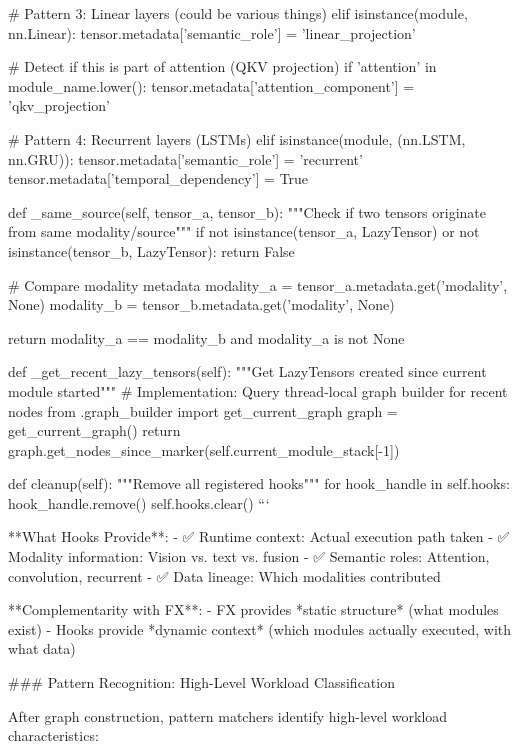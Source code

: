         # Pattern 3: Linear layers (could be various things)
        elif isinstance(module, nn.Linear):
            tensor.metadata['semantic_role'] = 'linear_projection'
            
            # Detect if this is part of attention (QKV projection)
            if 'attention' in module_name.lower():
                tensor.metadata['attention_component'] = 'qkv_projection'
        
        # Pattern 4: Recurrent layers (LSTMs)
        elif isinstance(module, (nn.LSTM, nn.GRU)):
            tensor.metadata['semantic_role'] = 'recurrent'
            tensor.metadata['temporal_dependency'] = True
    
    def _same_source(self, tensor_a, tensor_b):
        """Check if two tensors originate from same modality/source"""
        if not isinstance(tensor_a, LazyTensor) or not isinstance(tensor_b, LazyTensor):
            return False
        
        # Compare modality metadata
        modality_a = tensor_a.metadata.get('modality', None)
        modality_b = tensor_b.metadata.get('modality', None)
        
        return modality_a == modality_b and modality_a is not None
    
    def _get_recent_lazy_tensors(self):
        """Get LazyTensors created since current module started"""
        # Implementation: Query thread-local graph builder for recent nodes
        from .graph_builder import get_current_graph
        graph = get_current_graph()
        return graph.get_nodes_since_marker(self.current_module_stack[-1])
    
    def cleanup(self):
        """Remove all registered hooks"""
        for hook_handle in self.hooks:
            hook_handle.remove()
        self.hooks.clear()
```

**What Hooks Provide**:
- ✅ Runtime context: Actual execution path taken
- ✅ Modality information: Vision vs. text vs. fusion
- ✅ Semantic roles: Attention, convolution, recurrent
- ✅ Data lineage: Which modalities contributed

**Complementarity with FX**:
- FX provides *static structure* (what modules exist)
- Hooks provide *dynamic context* (which modules actually executed, with what data)

### Pattern Recognition: High-Level Workload Classification

After graph construction, pattern matchers identify high-level workload characteristics:

